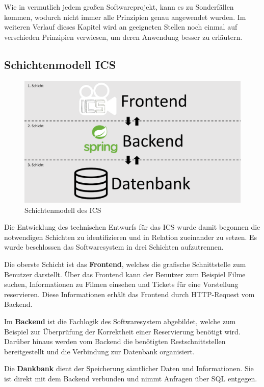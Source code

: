 		Wie in vermutlich jedem großen Softwareprojekt, kann es zu Sonderfällen kommen, wodurch nicht immer alle Prinzipien genau angewendet wurden. Im weiteren Verlauf dieses Kapitel wird an geeigneten Stellen noch einmal auf verschieden Prinzipien verwiesen, um deren Anwendung besser zu erläutern.
		
		\subsection{Schichtenmodell ICS}
		
		
		\begin{figure}[H]
			\centering 
			\includegraphics[width=12cm]{img/Schichtenmodell_ICS.pdf}
			\captionsetup{format=hang}
			\caption[Klassendiagramm]{\label{fig:Schichtenmodell} Schichtenmodell des ICS }
		\end{figure}
		
		Die Entwicklung des technischen Entwurfs für das \ac{ICS} wurde damit begonnen die notwendigen Schichten zu identifizieren und in Relation zueinander zu setzen. Es wurde beschlossen das Softwaresystem in drei Schichten aufzutrennen. 
		
		Die oberste Schicht ist das \glqq \textbf{Frontend}\grqq{}, welches die grafische Schnittstelle zum Benutzer darstellt. Über das Frontend kann der Benutzer zum Beispiel Filme suchen, Informationen zu Filmen einsehen und Tickets für eine Vorstellung reservieren. Diese Informationen erhält das Frontend durch HTTP-Request vom Backend.
		
		Im \glqq \textbf{Backend}\grqq{} ist die Fachlogik des Softwaresystem abgebildet, welche zum Beispiel zur Überprüfung der Korrektheit einer Reservierung benötigt wird. Darüber hinaus werden vom Backend die benötigten Restschnittstellen bereitgestellt und die Verbindung zur Datenbank organisiert. 
		
		Die \textbf{Dankbank} dient der Speicherung sämtlicher Daten und Informationen. Sie ist direkt mit dem Backend verbunden und nimmt Anfragen über SQL entgegen. 
		
